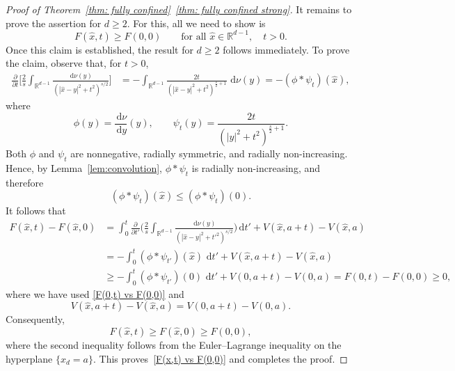 \documentclass{amsart}
\def\R{\mathbb{R}}
\newcommand{\ud}{\, \mathrm{d}}
\theoremstyle{plain}
\theoremstyle{remark}
\numberwithin{equation}{section}
\begin{document}
\begin{proof}[Proof of Theorem~\ref{thm: fully confined}~\ref{thm: fully confined strong}]
  It remains to prove the assertion for $d\ge2$. For this, all we need to show is 
  \begin{equation} \label{F(x,t) vs F(0,0)}
      F(\hat{x},t)\ge F(0,0)
    \qquad\text{for all }\hat{x}\in\R^{d-1},\quad t>0.
  \end{equation} 
Once this claim is established, the result for $d\ge2$ follows
immediately. 
To prove the claim, observe that, for $t>0$,  
    \begin{align}
    \frac{\partial}{\partial t}
    \bigg[
        \frac{2}{s}
        \int_{\R^{d-1}}
        \frac{\ud\nu(y)}
        {(|\hat{x}-y|^2+t^2)^{s/2}}
    \bigg]
    &=
    -\int_{\R^{d-1}}
    \frac{2t}
    {(|\hat{x}-y|^2+t^2)^{\frac{s}{2}+1}}
    \,\ud\nu(y)
    =
    -(\phi*\psi_t)(\hat{x}),
\end{align}
    where
    \begin{equation}
        \phi(y) = \frac{\ud\nu}{\ud y}(y), \qquad \psi_t(y) = \frac{2t}{(|y|^2+t^2)^{\frac{s}{2}+1}}. 
    \end{equation}
   Both $\phi$ and $\psi_t$ are nonnegative, radially symmetric, and
radially non-increasing. Hence, by Lemma~\ref{lem:convolution},
$\phi*\psi_t$ is radially non-increasing, and therefore
\begin{equation}
    (\phi*\psi_t)(\hat{x})
    \le
    (\phi*\psi_t)(0).
\end{equation}
It follows that 
\begin{align*}
    F(\hat{x},t)-F(\hat{x},0)
    &= \int_0^t \frac{\partial}{\partial t'}\bigg(\frac{2}{s}\int_{\R^{d-1}}\frac{\ud\nu(y)}{(|\hat{x}-y|^2+t'^2)^{s/2}}\bigg) \ud t' +V(\hat{x},a+t)-V(\hat{x},a)
    \\
    &=
    -\int_0^t
    (\phi*\psi_{t'})(\hat{x})\,\ud t'
    +V(\hat{x},a+t)-V(\hat{x},a)
    \\
    &\ge
    -\int_0^t
    (\phi*\psi_{t'})(0)\,\ud t'
    +V(0,a+t)-V(0,a)
    =
    F(0,t)-F(0,0)
    \ge0,
\end{align*} 
  where we have used \eqref{F(0,t) vs F(0,0)} and  
  $$
  V(\hat{x},a+t)-V(\hat{x},a)
    =
    V(0,a+t)-V(0,a).
  $$   
Consequently,
\[
    F(\hat{x},t)\ge F(\hat{x},0)\ge F(0,0),
\]
where the second inequality follows from the Euler--Lagrange inequality
on the hyperplane $\{x_d=a\}$. This proves~\eqref{F(x,t) vs F(0,0)}
and completes the proof. 
\end{proof}
\end{document}

